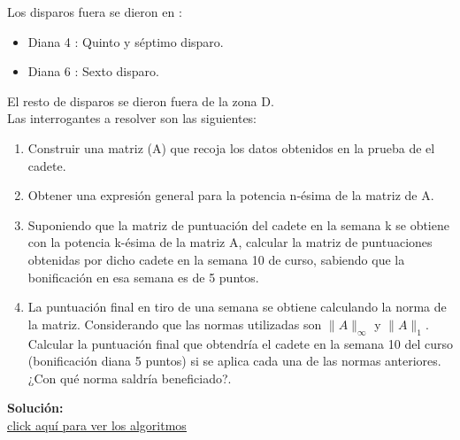\documentclass[12pt,a4paper]{article}
\begin{document}
\begin{multicols}{2}
\begin{itemize}
	\end{itemize}
	Los disparos fuera se dieron en :
	\begin{itemize}
		\item Diana 4 : Quinto y séptimo disparo.
		\item Diana 6 : Sexto disparo.
	\end{itemize}
	El resto de disparos se dieron fuera de la zona D.\\
	Las interrogantes a resolver son las siguientes:
	
	\begin{enumerate}
		\item Construir una matriz (A) que recoja los datos obtenidos en la prueba de el cadete.
		\item Obtener una expresión general para la potencia n-ésima de la matriz de A.
		\item Suponiendo que la matriz de puntuación del cadete en la semana k se obtiene con la potencia k-ésima de la matriz A, calcular la matriz de puntuaciones obtenidas por dicho cadete en la semana 10 de curso, sabiendo que la bonificación en esa semana es de 5 puntos.
		\item La puntuación final en tiro de una semana se obtiene calculando la norma de la matriz. Considerando que las normas utilizadas son $\|A\|_{\infty}$ y $\|A\|_{1}$. Calcular la puntuación final que obtendría el cadete en la semana 10 del curso (bonificación diana 5 puntos) si se aplica cada una de las normas anteriores. ¿Con qué norma saldría beneficiado?.
	\end{enumerate}
\end{multicols}

\textbf{Solución:}\\
\href{https://github.com/MillerSilva/Tiro-en-Diana/blob/master/proyecto2_numerico.ipynb}{\underline{click aquí para ver los algoritmos}}
\end{document}
